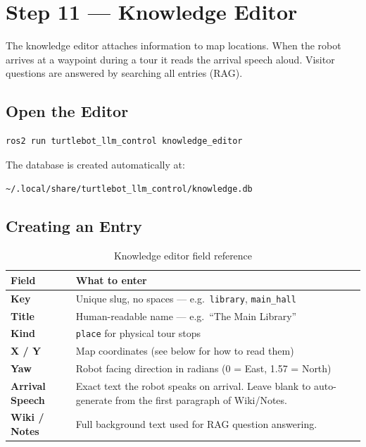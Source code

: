 \documentclass[12pt,a4paper]{report}
\begin{document}
\section{Step 11 --- Knowledge Editor}

The knowledge editor attaches information to map locations.
When the robot arrives at a waypoint during a tour it reads the
arrival speech aloud.  Visitor questions are answered by searching
all entries (RAG).

\subsection{Open the Editor}

\begin{lstlisting}[style=bashstyle]
ros2 run turtlebot_llm_control knowledge_editor
\end{lstlisting}

The database is created automatically at:
\begin{center}
  \texttt{\textasciitilde/.local/share/turtlebot\_llm\_control/knowledge.db}
\end{center}

\subsection{Creating an Entry}

\begin{table}[H]
  \centering
  \caption{Knowledge editor field reference}
  \begin{tabularx}{\linewidth}{L{3.5cm} X}
    \toprule
    \textbf{Field} & \textbf{What to enter} \\
    \midrule
    \textbf{Key}            & Unique slug, no spaces --- e.g.\ \texttt{library}, \texttt{main\_hall} \\
    \textbf{Title}          & Human-readable name --- e.g.\ ``The Main Library'' \\
    \textbf{Kind}           & \texttt{place} for physical tour stops \\
    \textbf{X / Y}          & Map coordinates (see below for how to read them) \\
    \textbf{Yaw}            & Robot facing direction in radians (0 = East, 1.57 = North) \\
    \textbf{Arrival Speech} & Exact text the robot speaks on arrival.  Leave blank to auto-generate from the first paragraph of Wiki/Notes. \\
    \textbf{Wiki / Notes}   & Full background text used for RAG question answering. \\
    \bottomrule
  \end{tabularx}
\end{table}
\end{document}
